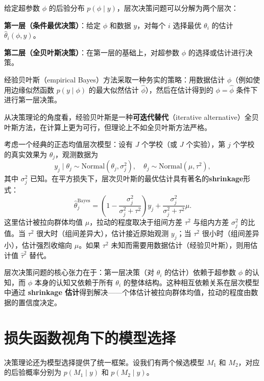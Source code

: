 给定超参数 $\phi$ 的后验分布 $p(\phi \mid y)$，层次决策问题可以分解为两个层次：

\textbf{第一层（条件最优决策）}：给定 $\phi$ 和数据 $y$，对每个 $i$ 选择最优 $\theta_i$ 的估计 $\hat{\theta}_i(\phi, y)$。

\textbf{第二层（全贝叶斯决策）}：在第一层的基础上，对超参数 $\phi$ 的选择或估计进行决策。

经验贝叶斯（empirical Bayes）方法采取一种务实的策略：用数据估计 $\phi$（例如使用边缘似然函数 $p(y \mid \phi)$ 的最大似然估计 $\hat{\phi}$），然后在估计得到的 $\phi = \hat{\phi}$ 条件下进行第一层决策。

从决策理论的角度看，经验贝叶斯是一种\textbf{可迭代替代}（iterative alternative）全贝叶斯方法，在计算上更为可行，但理论上不如全贝叶斯方法严格。

\begin{Example}\label{ex:normal-hierarchical}
  考虑一个经典的正态均值层次模型：设有 $J$ 个学校（或 $J$ 个实验），第 $j$ 个学校的真实效果为 $\theta_j$，观测数据为
  \[
  y_j \mid \theta_j \sim \text{Normal}(\theta_j, \sigma_j^2), \quad \theta_j \sim \text{Normal}(\mu, \tau^2),
  \]
  其中 $\sigma_j^2$ 已知。在平方损失下，层次贝叶斯的最优估计具有著名的\textbf{shrinkage}形式：
  \[
  \hat{\theta}_j^{\text{Bayes}} = \left(1 - \frac{\sigma_j^2}{\sigma_j^2 + \tau^2}\right) y_j + \frac{\sigma_j^2}{\sigma_j^2 + \tau^2} \mu.
  \]
  这里估计被拉向群体均值 $\mu$，拉动的程度取决于组间方差 $\tau^2$ 与组内方差 $\sigma_j^2$ 的比值。当 $\tau^2$ 很大时（组间差异大），估计接近原始观测 $y_j$；当 $\tau^2$ 很小时（组间差异小），估计强烈收缩向 $\mu$。如果 $\tau^2$ 未知而需要用数据估计（经验贝叶斯），则用估计值 $\hat{\tau}^2$ 替代。
\end{Example}

\begin{Remark}
  层次决策问题的核心张力在于：第一层决策（对 $\theta_i$ 的估计）依赖于超参数 $\phi$ 的认知，而 $\phi$ 本身的认知又依赖于所有 $\theta_i$ 的整体结构。这种相互依赖关系在层次模型中通过\textbf{ shrinkage 估计}得到解决——个体估计被拉向群体均值，拉动的程度由数据的置信度决定。
\end{Remark}

\section{损失函数视角下的模型选择}

决策理论还为模型选择提供了统一框架。设我们有两个候选模型 $M_1$ 和 $M_2$，对应的后验概率分别为 $p(M_1 \mid y)$ 和 $p(M_2 \mid y)$。

